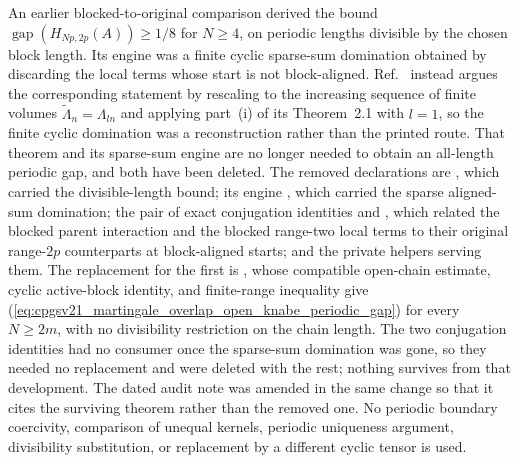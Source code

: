 \documentclass{article}
\begin{document}
An earlier blocked-to-original comparison derived the bound
$\operatorname{gap}(H_{Np,2p}(A))\geq1/8$ for $N\geq4$, on periodic lengths
divisible by the chosen block length.  Its engine was a finite cyclic
sparse-sum domination obtained by discarding the local terms whose start is not
block-aligned.  Ref.~\cite{Nachtergaele1996Spectral} instead argues
the corresponding statement by rescaling to the increasing sequence of finite
volumes
$\tilde\Lambda_n=\Lambda_{ln}$ and applying part~(i) of its Theorem~2.1 with
$l=1$, so the finite cyclic domination was a reconstruction rather than the
printed route.  That theorem and its sparse-sum engine are no longer needed to
obtain an all-length periodic gap, and both have been deleted.  The removed
declarations are
,
which carried the divisible-length bound; its engine
, which carried the
sparse aligned-sum domination; the pair of exact conjugation identities
 and
, which related the
blocked parent interaction and the blocked range-two local terms to their
original range-$2p$ counterparts at block-aligned starts; and the private
helpers serving them.  The replacement for the first is
,
whose compatible open-chain estimate, cyclic active-block identity, and
finite-range inequality give
(\ref{eq:cpgsv21_martingale_overlap_open_knabe_periodic_gap}) for every
$N\geq2m$, with no divisibility restriction on the chain length.  The two
conjugation identities had no consumer once the sparse-sum domination was gone,
so they needed no replacement and were deleted with the rest; nothing survives
from that development.  The dated audit note
 was amended
in the same change so that it cites the surviving theorem rather than the
removed one.  No periodic boundary coercivity, comparison of unequal kernels,
periodic uniqueness argument, divisibility substitution, or replacement by a
different cyclic tensor is used.
\end{document}
